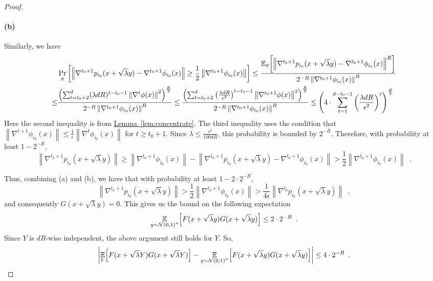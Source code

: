 \documentclass[12pt]{article}
\newcommand{\lem}[1]{\hyperref[lem:#1]{Lemma~\ref*{lem:#1}}}
\newcommand{\grad}[2]{\nabla^{#1}{#2}}
\newcommand{\br}[1]{\left(#1\right)} \newcommand{\Br}[1]{\left[#1\right]} \newcommand{\st}[1]{\left\{#1\right\}} \newcommand{\tr}[1]{\mathrm{Tr}\!\Br{#1}} \newcommand{\abs}[1]{\left|#1 \right|} \newcommand{\norm}[1]{\left\lVert #1 \right\rVert} \newcommand{\agl}[2]{\theta^{\br{#1}}_{#2}} \newcommand{\aglp}[2]{{\theta'}^{\br{#1}}_{#2}} \newcommand{\lint}[1]{\left\lfloor#1\right\rfloor} \newcommand{\poly}[1]{\mathrm{poly}\!\br{#1}} \newcommand{\negl}[1]{\mathrm{negl}\!\br{#1}} \newcommand{\de}[1]{\mathrm{d}#1} \newcommand{\val}[1]{\mathrm{val}\!\br{#1}} \newcommand{\vall}[1]{\mathrm{val}\br{#1}} \newcommand{\nd}[1]{\mathcal{N}\!\br{#1}} \newcommand{\ketbratwo}[2]{\ket{#1} \hspace{-0.4em}\bra{#2}} \newcommand{\ketbra}[1]{\ketbratwo{#1}{#1}} \newcommand{\id}{\ensuremath{\mathds{1}}} \newcommand{\ogroup}[1]{\mathrm{O}\!\br{#1}} \newcommand{\ugroup}[1]{\mathrm{U}\!\br{#1}} \newcommand{\td}{\mathrm{TD}} \newcommand{\tv}[1]{\norm{#1}_{\mathrm{TV}}} \newcommand {\defeq} {\ensuremath{ \stackrel{\mathrm{def}}{=} }} \newcommand{\vdim}{\ensuremath{N}} \newcommand{\dimin}{\ensuremath{n}} \newcommand{\dimout}{\ensuremath{m}} \newcommand{\ncopy}{\ell} \newcommand{\hspacein}{\H_\mathrm{in}} \newcommand{\hspaceout}{\H_\mathrm{out}} \newcommand{\Sin}{\S(\hspacein)} \newcommand{\Sout}{\S(\hspaceout)} \newcommand{\haar}{\ensuremath{\mu}} \newcommand{\tensorhaar}{\ensuremath{\eta}} \newcommand{\tensorsrss}{\ensuremath{\nu}} \newcommand{\qadvice}{\ensuremath{\rho}} \newcommand{\tp}{\otimes} \newcommand{\wone}[2]{W_1\!\br{#1,#2}}
\begin{document}
\begin{proof}
	\paragraph{(b)}
	Similarly, we have
	\vspace{-1em}
	\begin{align*}
		&\Pr_y\Br{\norm{ \grad{t_0+1}{p_{i_0}(x+\sqrt{\lambda}y)} - \grad{t_0+1}{\phi_{i_0}(x)}} \geq \frac{1}{2}\norm{ \grad{t_0+1}{\phi_{i_0}(x)}} }
		\leq \frac{\expect{y}{\norm{ \grad{t_0+1}{p_{i_0}(x+\sqrt{\lambda}y)} - \grad{t_0+1}{\phi_{i_0}(x)}}^R}}{ 2^{-R}\norm{ \grad{t_0+1}{\phi_{i_0}(x)}}^R} \\
		\leq &\frac{\br{ \sum_{t=t_0+2}^d (\lambda d R)^{t-t_0-1} \norm{ \grad{t}{\phi(x)}}^2 }^{\frac{R}{2}} }{2^{-R}\norm{ \grad{t_0+1}{\phi_{i_0}(x)}}^R} 
		\leq \frac{\br{ \sum_{t=t_0+2}^d \br{\frac{\lambda d R}{\epsilon^2}}^{t-t_0-1}\norm{ \grad{t_0+1}{\phi(x)}}^2 }^{\frac{R}{2}} }{2^{-R}\norm{ \grad{t_0+1}{\phi_{i_0}(x)}}^R} 
		\leq \br{4 \cdot  \sum_{t=1}^{d-t_0-1} \br{\frac{\lambda d R}{\epsilon^2}}^{t}}^{\frac{R}{2}}
	\end{align*}
	Here the second inequality is from \lem{concentrate}.
	The third inequality uses the condition that $ \norm{\grad{t+1}{\phi_{i_0}(x)}} \leq \frac{1}{\epsilon}\norm{\grad{t}{\phi_{i_0}(x)}} $ for $t\geq t_0+1$.
	Since $\lambda\leq \frac{\epsilon^2}{100dR}$, this probability is bounded by $2^{-R}$. Therefore, with probability at least $1-2^{-R}$,
	\[
	\norm{ \grad{t_0+1}{p_{i_0}(x+\sqrt{\lambda}y)}}\geq
	\norm{ \grad{t_0+1}{\phi_{i_0}(x)}} -
	\norm{ \grad{t_0+1}{p_{i_0}(x+\sqrt{\lambda}y)} - \grad{t_0+1}{\phi_{i_0}(x)}} > \frac{1}{2}\norm{ \grad{t_0+1}{\phi_{i_0}(x)}}\enspace .
	\]
	
	Thus, combining (a) and (b), we have that with probability at least $1-2\cdot 2^{-R}$,
	\[
	\norm{ \grad{t_0+1}{p_{i_0}(x+\sqrt{\lambda}y)}}> \frac{1}{2}\norm{ \grad{t_0+1}{\phi_{i_0}(x)}} > \frac{1}{4\epsilon} \norm{ \grad{t_0}{p_{i_0}(x+\sqrt{\lambda}y)}} \enspace ,
	\]
	and consequently $G(x+\sqrt{\lambda}y) = 0$. This gives us the bound on the following expectation
	\[
		\expect{y\sim\NN\br{0,1}^n}{
			F(x+\sqrt{\lambda}y)G(x+\sqrt{\lambda}y)
		} \leq 2\cdot 2^{-R}\enspace .
	\]
	Since $Y$ is $dR$-wise independent, the above argument still holds for $Y$.
	So, 
	\[
	\abs{
		\expect{Y}{
			F(x+\sqrt{\lambda}Y)G(x+\sqrt{\lambda}Y)
		}
		-
		\expect{y\sim\NN\br{0,1}^n}{
			F(x+\sqrt{\lambda}y)G(x+\sqrt{\lambda}y)
		}
	} \leq 4\cdot 2^{-R} \enspace .
	\]
	

\end{proof}
\end{document}

